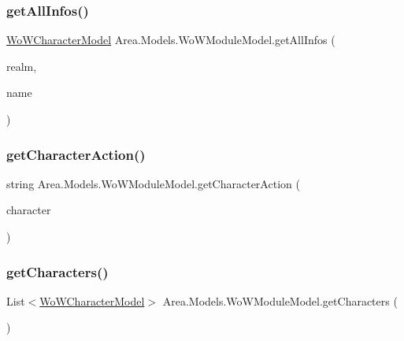 \subsubsection{\texorpdfstring{get\+All\+Infos()}{getAllInfos()}}
{\footnotesize\ttfamily \mbox{\hyperlink{classArea_1_1Models_1_1WoWCharacterModel}{Wo\+W\+Character\+Model}} Area.\+Models.\+Wo\+W\+Module\+Model.\+get\+All\+Infos (\begin{DoxyParamCaption}\item[{string}]{realm,  }\item[{string}]{name }\end{DoxyParamCaption})\hspace{0.3cm}{\ttfamily [inline]}}

\mbox{\label{classArea_1_1Models_1_1WoWModuleModel_a063f2a1a7837561b588f016d828061ee}} 
\subsubsection{\texorpdfstring{get\+Character\+Action()}{getCharacterAction()}}
{\footnotesize\ttfamily string Area.\+Models.\+Wo\+W\+Module\+Model.\+get\+Character\+Action (\begin{DoxyParamCaption}\item[{\mbox{\hyperlink{classArea_1_1Models_1_1WoWCharacterModel}{Wo\+W\+Character\+Model}}}]{character }\end{DoxyParamCaption})\hspace{0.3cm}{\ttfamily [inline]}}

\mbox{\label{classArea_1_1Models_1_1WoWModuleModel_a5b0f580381e294a2780280f977df3c82}} 
\subsubsection{\texorpdfstring{get\+Characters()}{getCharacters()}}
{\footnotesize\ttfamily List$<$\mbox{\hyperlink{classArea_1_1Models_1_1WoWCharacterModel}{Wo\+W\+Character\+Model}}$>$ Area.\+Models.\+Wo\+W\+Module\+Model.\+get\+Characters (\begin{DoxyParamCaption}{ }\end{DoxyParamCaption})\hspace{0.3cm}{\ttfamily [inline]}}

